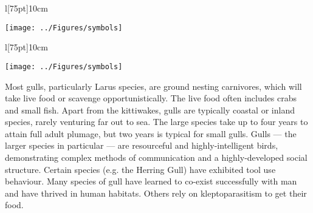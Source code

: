 \pagestyle{fancy}

\begin{mycode}
\begin{wrapfigure}[15]{l}[75pt]{10cm}
	\begin{center}
        	\texttt{[image: ../Figures/symbols]}
        	\end{center}
        	\vspace{10pt}
        	\caption{\LaTeX \; için kullanılan semboller}
        	\label{fig:sym5}
\end{wrapfigure}
\end{mycode}


\begin{wrapfigure}[15]{l}[75pt]{10cm}
 \begin{center}
\texttt{[image: ../Figures/symbols]}
\end{center}
  \vspace{10pt}
  \caption{\LaTeX \; için kullanılan semboller}
  \label{fig:sym5}
\end{wrapfigure}
Most gulls, particularly Larus species, are ground nesting carnivores, which will take live food or scavenge opportunistically. The live food often includes crabs and small fish. Apart from the kittiwakes, gulls  are typically coastal or inland species, rarely venturing far out to sea. The large species take up to four years to attain full adult plumage, but two years is typical for small gulls.
Gulls — the larger species in particular — are resourceful and highly-intelligent birds, demonstrating complex methods of communication and a highly-developed social structure. Certain species (e.g. the Herring Gull) have exhibited tool use behaviour. Many species of gull 
have learned to co-exist successfully with man and have thrived in human habitats. Others rely on kleptoparasitism to get their food.

\newpage


